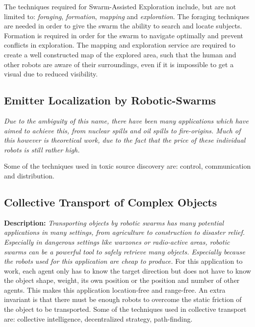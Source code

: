   The techniques required for Swarm-Assisted Exploration include, but are not limited to: \emph{foraging}, \emph{formation}, \emph{mapping} and \emph{exploration}.\cite{Naghsh2008,Penders2011} The foraging techniques are needed in order to give the swarm the ability to search and locate subjects. Formation is required in order for the swarm to navigate optimally and prevent conflicts in exploration. The mapping and exploration service are required to create a well constructed map of the explored area, such that the human and other robots are aware of their surroundings, even if it is impossible to get a visual due to reduced visibility.

  \subsection{Emitter Localization by Robotic-Swarms}
  \emph{Due to the ambiguity of this name, there have been many applications which have aimed to achieve this, from nuclear spills and oil spills to fire-origins. Much of this however is theoretical work, due to the fact that the price of these individual robots is still rather high.}

  Some of the techniques used in toxic source discovery are: control, communication and distribution.\cite{Li2012}

 \subsection{Collective Transport of Complex Objects}
 \textbf{Description: } \emph{Transporting objects by robotic swarms has many potential applications in many settings, from agriculture to construction to disaster relief. Especially in dangerous settings like warzones or radio-active areas, robotic swarms can be a powerful tool to safely retrieve many objects. Especially because the robots used for this application are cheap to produce. }
For this application to work, each agent only has to know the target direction but does not have to know the object shape, weight, its own position or the position and number of other agents. This makes this application location-free and range-free. An extra invariant is that there must be enough robots to overcome the static friction of the object to be transported. Some of the techniques used in collective transport are: collective intelligence, decentralized strategy, path-finding. \cite{Rubenstein}


